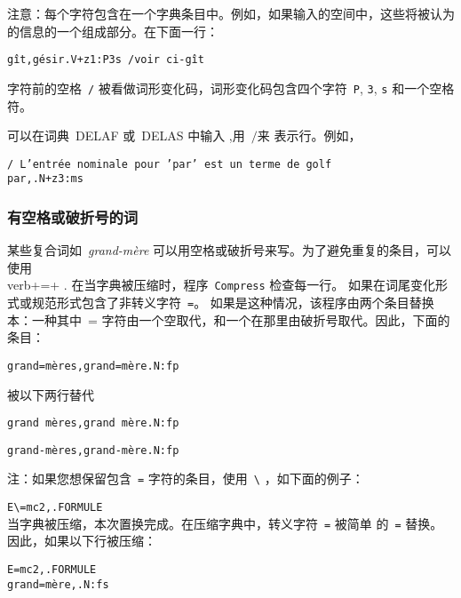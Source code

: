 \bigskip
\noindent 注意：每个字符包含在一个字典条目中。例如，如果输入的空间中，这些将被认为的信息的一个组成部分。在下面一行：


\begin{verbatim}
gît,gésir.V+z1:P3s /voir ci-gît
\end{verbatim}

\bigskip \noindent 字符前的空格\ \verb+/+ 被看做词形变化码，词形变化码包含四个字符\ \verb+P+, \verb+3+, \verb+s+ 和一个空格符。


\bigskip \noindent 可以在词典\ DELAF 或\ DELAS 中输入
,用\ $/$来 表示行。例如，

\bigskip
\begin{verbatim}
/ L’entrée nominale pour ’par’ est un terme de golf
par,.N+z3:ms
\end{verbatim}


\subsubsection{有空格或破折号的词}

\index{\verb+=+}\index{\verb+\=+}

某些复合词如\ \textit{grand-mère} 可以用空格或破折号来写。为了避免重复的条目，可以使用\\verb+=+ . 在当字典被压缩时，程序\ \verb+Compress+
 检查每一行。
如果在词尾变化形式或规范形式包含了非转义字符\ \verb+=+。 如果是这种情况，该程序由两个条目替换本：一种其中\ = 字符由一个空取代，和一个在那里由破折号取代。因此，下面的条目：


\bigskip \verb$grand=mères,grand=mère.N:fp$

\bigskip
\noindent 被以下两行替代

\bigskip
\verb$grand mères,grand mère.N:fp$

\verb$grand-mères,grand-mère.N:fp$


\bigskip
\noindent 注：如果您想保留包含\ \verb+=+ 字符的条目，使用\ \verb+\+ ，如下面的例子：


\bigskip
\verb$E\=mc2,.FORMULE$\\

当字典被压缩，本次置换完成。在压缩字典中，转义字符\ \verb+=+ 被简单 的\ \verb+=+ 替换。
因此，如果以下行被压缩： 

\begin{verbatim}
E=mc2,.FORMULE
grand=mère,.N:fs
\end{verbatim}

